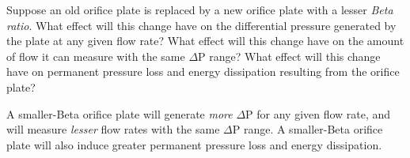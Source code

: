 

Suppose an old orifice plate is replaced by a new orifice plate with a lesser {\it Beta ratio}.  What effect will this change have on the differential pressure generated by the plate at any given flow rate?  What effect will this change have on the amount of flow it can measure with the same $\Delta$P range?  What effect will this change have on permanent pressure loss and energy dissipation resulting from the orifice plate?







A smaller-Beta orifice plate will generate {\it more} $\Delta$P for any given flow rate, and will measure {\it lesser} flow rates with the same $\Delta$P range.  A smaller-Beta orifice plate will also induce greater permanent pressure loss and energy dissipation.










